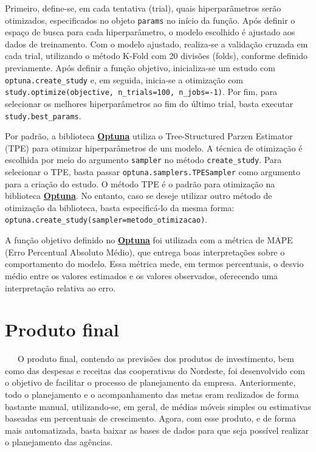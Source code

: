 \documentclass[
  12pt,
  a4paper,
]{scrreprt}
\begin{document}
Primeiro, define-se, em cada tentativa (trial), quais hiperparâmetros
serão otimizados, especificados no objeto \texttt{params} no início da
função. Após definir o espaço de busca para cada hiperparâmetro, o
modelo escolhido é ajustado aos dados de treinamento. Com o modelo
ajustado, realiza-se a validação cruzada em cada trial, utilizando o
método K-Fold com 20 divisões (folds), conforme definido previamente.
Após definir a função objetivo, inicializa-se um estudo com
\texttt{optuna.create\_study} e, em seguida, inicia-se a otimização com
\texttt{study.optimize(objective,\ n\_trials=100,\ n\_jobs=-1)}. Por
fim, para selecionar os melhores hiperparâmetros ao fim do último trial,
basta executar \texttt{study.best\_params}.

\vspace{12pt}

Por padrão, a biblioteca \href{https://optuna.org/}{\textbf{Optuna}}
utiliza o Tree-Structured Parzen Estimator (TPE) para otimizar
hiperparâmetros de um modelo. A técnica de otimização é escolhida por
meio do argumento \texttt{sampler} no método \texttt{create\_study}.
Para selecionar o TPE, basta passar \texttt{optuna.samplers.TPESampler}
como argumento para a criação do estudo. O método TPE é o padrão para
otimização na biblioteca \href{https://optuna.org/}{\textbf{Optuna}}. No
entanto, caso se deseje utilizar outro método de otimização da
biblioteca, basta especificá-lo da mesma forma:
\texttt{optuna.create\_study(sampler=metodo\_otimizacao)}.

\vspace{12pt}

A função objetivo definido no
\href{https://optuna.org/}{\textbf{Optuna}} foi utilizada com a métrica
de MAPE (Erro Percentual Absoluto Médio), que entrega boas
interpretações sobre o comportamento do modelo. Essa métrica mede, em
termos percentuais, o desvio médio entre os valores estimados e os
valores observados, oferecendo uma interpretação relativa ao erro.

\chapter{Produto final}\label{produto-final}

~~~O produto final, contendo as previsões dos produtos de investimento,
bem como das despesas e receitas das cooperativas do Nordeste, foi
desenvolvido com o objetivo de facilitar o processo de planejamento da
empresa. Anteriormente, todo o planejamento e o acompanhamento das metas
eram realizados de forma bastante manual, utilizando-se, em geral, de
médias móveis simples ou estimativas baseadas em percentuais de
crescimento. Agora, com esse produto, e de forma mais automatizada,
basta baixar as bases de dados para que seja possível realizar o
planejamento das agências.
\end{document}
